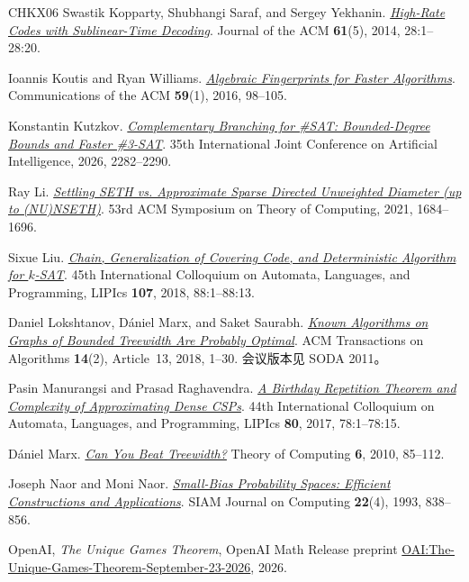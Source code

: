 \documentclass[11pt,reqno]{amsart}
\numberwithin{equation}{section}
\theoremstyle{definition}\newtheorem{definition}[theorem]{定义}
\theoremstyle{remark}\newtheorem{remark}[theorem]{注}
\begin{document}
\begin{thebibliography}{CHKX06}
Swastik Kopparty, Shubhangi Saraf, and Sergey Yekhanin.
\href{https://doi.org/10.1145/2629416}
{\emph{High-Rate Codes with Sublinear-Time Decoding}}.
Journal of the ACM \textbf{61}(5), 2014, 28:1--28:20.

Ioannis Koutis and Ryan Williams.
\href{https://doi.org/10.1145/2742544}
{\emph{Algebraic Fingerprints for Faster Algorithms}}.
Communications of the ACM \textbf{59}(1), 2016, 98--105.

Konstantin Kutzkov.
\href{https://doi.org/10.24963/ijcai.2026/254}
{\emph{Complementary Branching for \#SAT: Bounded-Degree Bounds and Faster \#3-SAT}}.
35th International Joint Conference on Artificial Intelligence, 2026, 2282--2290.

Ray Li.
\href{https://arxiv.org/abs/2008.05106}
{\emph{Settling SETH vs. Approximate Sparse Directed Unweighted Diameter
(up to (NU)NSETH)}}.
53rd ACM Symposium on Theory of Computing, 2021, 1684--1696.

Sixue Liu.
\href{https://doi.org/10.4230/LIPIcs.ICALP.2018.88}
{\emph{Chain, Generalization of Covering Code, and Deterministic Algorithm for $k$-SAT}}.
45th International Colloquium on Automata, Languages, and Programming,
LIPIcs \textbf{107}, 2018, 88:1--88:13.

Daniel Lokshtanov, D\'aniel Marx, and Saket Saurabh.
\href{https://doi.org/10.1145/3170442}
{\emph{Known Algorithms on Graphs of Bounded Treewidth Are Probably Optimal}}.
ACM Transactions on Algorithms \textbf{14}(2), Article~13, 2018, 1--30.
会议版本见 SODA 2011。

Pasin Manurangsi and Prasad Raghavendra.
\href{https://doi.org/10.4230/LIPIcs.ICALP.2017.78}
{\emph{A Birthday Repetition Theorem and Complexity of Approximating
Dense CSPs}}.
44th International Colloquium on Automata, Languages, and Programming,
LIPIcs \textbf{80}, 2017, 78:1--78:15.

D\'aniel Marx.
\href{https://doi.org/10.4086/toc.2010.v006a005}
{\emph{Can You Beat Treewidth?}}
Theory of Computing \textbf{6}, 2010, 85--112.

Joseph Naor and Moni Naor.
\href{https://doi.org/10.1137/0222053}
{\emph{Small-Bias Probability Spaces: Efficient Constructions and Applications}}.
SIAM Journal on Computing \textbf{22}(4), 1993, 838--856.

OpenAI, \emph{The Unique Games Theorem},
OpenAI Math Release preprint
\href{https://github.com/openai/math/blob/main/preprints/The-Unique-Games-Theorem-September-23-2026/paper.pdf}{OAI:The-Unique-Games-Theorem-September-23-2026},
2026.


\end{thebibliography}
\end{document}
